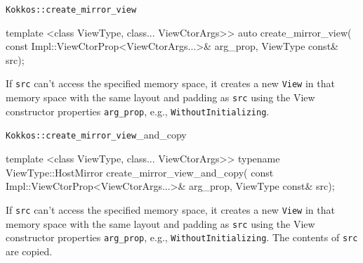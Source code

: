 
\begin{frame}[fragile]{\texttt{Kokkos::create\_mirror\_view}}
\begin{code}
template <class ViewType, class... ViewCtorArgs>>
auto
create_mirror_view(
  const Impl::ViewCtorProp<ViewCtorArgs...>& arg_prop,
  ViewType const& src);
\end{code}
\vspace{10pt}

If \texttt{src} can't access the specified memory space, it creates a new \texttt{View} in that memory space with the same layout and padding as \texttt{src} using the View constructor properties \texttt{arg\_prop}, e.g., \texttt{WithoutInitializing}.
\end{frame}


\begin{frame}[fragile]{\texttt{Kokkos::create\_mirror\_view}\_and\_copy}
\begin{code}
template <class ViewType, class... ViewCtorArgs>>
typename ViewType::HostMirror
create_mirror_view_and_copy(
  const Impl::ViewCtorProp<ViewCtorArgs...>& arg_prop,
  ViewType const& src);
\end{code}
\vspace{10pt}

If \texttt{src} can't access the specified memory space, it creates a new \texttt{View} in that memory space with the same layout and padding as \texttt{src} using the View constructor properties \texttt{arg\_prop}, e.g., \texttt{WithoutInitializing}. The contents of \texttt{src} are copied.
\end{frame}


